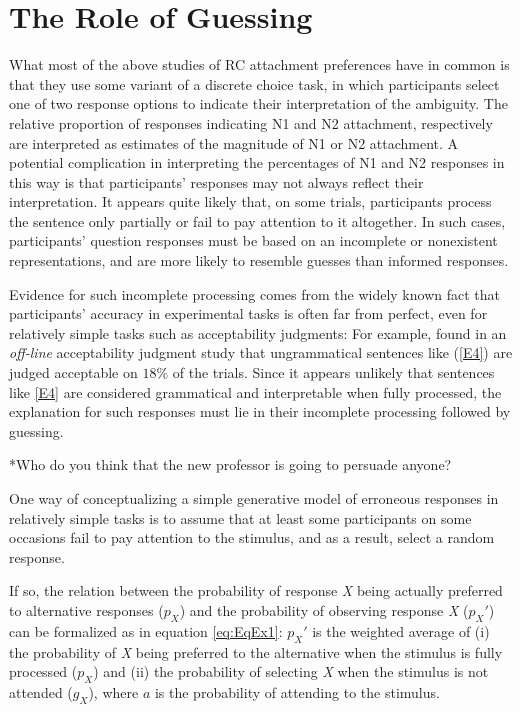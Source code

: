\documentclass[11pt]{article}\usepackage[]{graphicx}\usepackage[]{color}
\begin{document}
\section{The Role of Guessing}

What most of the above studies of RC attachment preferences have in common is that they use some variant of a discrete choice task, in which participants select one of two response options to indicate their interpretation of the ambiguity. The relative proportion of responses indicating N1 and N2 attachment, respectively are interpreted as estimates of the magnitude of N1 or N2 attachment.
A potential complication in interpreting the percentages of N1 and N2 responses in this way is that participants' responses may not always reflect their interpretation. It appears quite likely that, on some trials, participants process the sentence only partially or fail to pay attention to it altogether. In such cases, participants' question responses must be based on an incomplete or nonexistent representations, 
and are more likely to resemble guesses than informed responses.

Evidence for such incomplete processing comes from the widely known fact that participants' accuracy in experimental tasks is often far from perfect, even for relatively simple tasks such as acceptability judgments: For example, \citet{DillonWagers:2019} found in an \textit{off-line} acceptability judgment study that ungrammatical sentences like (\ref{E4}) are judged acceptable on $18\%$ of the trials. 
Since it appears unlikely that sentences like \ref{E4} are considered grammatical and interpretable when fully processed, the explanation for such responses must lie in their incomplete processing followed by guessing.

\begin{exe}
\ex \label{E4} *Who do you think that the new professor is going to persuade anyone?
\end{exe}

One way of conceptualizing a simple generative model of erroneous responses in relatively simple tasks is to assume that at least some participants on some occasions fail to pay attention to the stimulus, and as a result, select a random response. 

If so, the relation between the probability of response \textit{X}  being actually preferred to alternative responses ($p_X$) and the probability of observing response \textit{X} ($p_X'$) can be formalized as in equation \ref{eq:EqEx1}: 
$p_{X}'$ is the weighted average of (i) the probability of \textit{X} being preferred to the alternative when the stimulus is fully processed ($p_{X}$) and (ii) the probability of selecting \textit{X} when the stimulus is not attended ($g_X$), where $a$ is the probability of attending to the stimulus.
\end{document}
